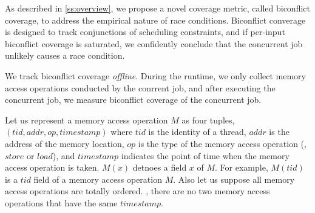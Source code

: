
As described in \autoref{ss:overview}, we propose a novel coverage
metric, called biconflict coverage, to address the empirical nature of
race conditions.
%
Biconflict converage is designed to track conjunctions of scheduling
constraints, and if per-input biconflict coverage is saturated, we
confidently conclude that the concurrent job unlikely causes a race
condition.

We track biconflict coverage \textit{offline}. During the runtime, we
only collect memory access operations conducted by the conrrent job,
and after executing the concurrent job, we measure biconflict coverage
of the concurrent job.

%
Let us represent a memory access operation $M$ as four tuples,
$(tid, addr, op, timestamp)$ where $tid$ is the identity of a thread,
$addr$ is the address of the memory location, $op$ is the type of the
memory access operation (\ie, $store$ or $load$), and $timestamp$
indicates the point of time when the memory access operation is taken.
%
$M(x)$ detnoes a field $x$ of $M$. For example, $M(tid)$ is a $tid$
field of a memory access operation $M$.
%
Also let us suppose all memory access operations are totally
ordered. \ie, there are no two memory access operations that have the
same $timestamp$.

